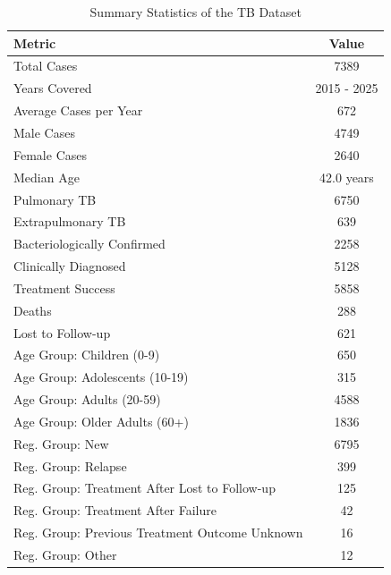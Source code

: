 \begin{table}[htbp]

\caption{Summary Statistics of the TB Dataset}
\label{tab:summary_statistics}
\begin{tabular}{lc}

\toprule

Metric & Value \\

\midrule

Total Cases & 7389 \\
Years Covered & 2015 - 2025 \\
Average Cases per Year & 672 \\
Male Cases & 4749 \\
Female Cases & 2640 \\
Median Age & 42.0 years \\
Pulmonary TB & 6750 \\
Extrapulmonary TB & 639 \\
Bacteriologically Confirmed & 2258 \\
Clinically Diagnosed & 5128 \\
Treatment Success & 5858 \\
Deaths & 288 \\
Lost to Follow-up & 621 \\
Age Group: Children (0-9) & 650 \\
Age Group: Adolescents (10-19) & 315 \\
Age Group: Adults (20-59) & 4588 \\
Age Group: Older Adults (60+) & 1836 \\
Reg. Group: New & 6795 \\
Reg. Group: Relapse & 399 \\
Reg. Group: Treatment After Lost to Follow-up & 125 \\
Reg. Group: Treatment After Failure & 42 \\
Reg. Group: Previous Treatment Outcome Unknown & 16 \\
Reg. Group: Other & 12 \\

\bottomrule

\end{tabular}

\end{table}
